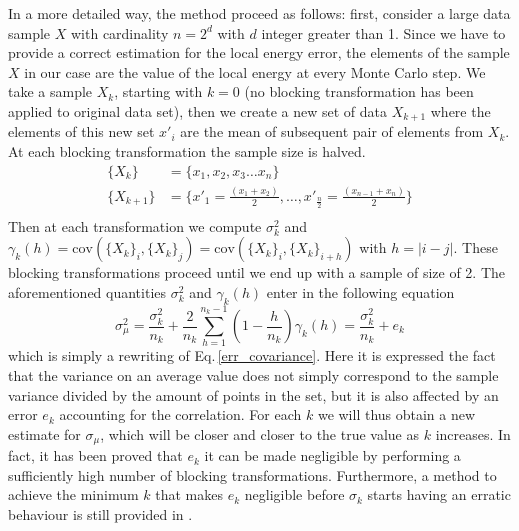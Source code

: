 In a more detailed way, the method proceed as follows: first, consider a large data sample $X$ with cardinality $n=2^d$ with $d$ integer greater than 1. Since we have to provide a correct estimation for the local energy error, the elements of the sample $X$ in our case are the value of the local energy at every Monte Carlo step. We take a sample $X_k$, starting with $k=0$ (no blocking transformation has been applied to original data set), then we create a new set of data $X_{k+1}$ where the elements of this new set $x'_i$ are the mean of subsequent pair of elements from $X_k$. At each blocking transformation the sample size is halved.
\begin{align*}
    \{X_k\} &= \{x_1, x_2, x_3 \dots x_n\} \\
    \{X_{k+1}\} &= \bigg\{x'_1=\frac{(x_1+x_2)}{2}, \dots , x'_{\frac{n}{2}}=\frac{(x_{n-1} + x_{n})}{2} \bigg\} \\
\end{align*}
Then at each transformation we compute $\sigma_k^2$ and $\gamma_k(h) = \text{cov}(\{X_k\}_i , \{X_k\}_j)=\text{cov}(\{X_k\}_i , \{X_k\}_{i+h})$ with $h =|i-j|$. These blocking transformations proceed until we end up with a sample of size of 2. The aforementioned quantities $\sigma_k^2$ and $\gamma_k(h)$ enter in the following equation
\begin{equation*}
    \sigma_{\mu}^2 = \frac{\sigma_k^2}{n_k} + \frac{2}{n_k}\sum_{h=1}^{n_k - 1} \left(1-\frac{h}{n_k}\right)\gamma_k(h) = \frac{\sigma_k^2}{n_k} +e_k
\end{equation*}
which is simply a rewriting of Eq.\,\ref{err_covariance}. Here it is expressed the fact that the variance on an average value does not simply correspond to the sample variance divided by the amount of points in the set, but it is also affected by an error $e_k$ accounting for the correlation. For each $k$ we will thus obtain a new estimate for $\sigma_{\mu}$, which will be closer and closer to the true value as $k$ increases. In fact, it has been proved \cite{Marius} that $e_k$ it can be made negligible by performing a sufficiently high number of blocking transformations. Furthermore, a method to achieve the minimum $k$ that makes $e_k$ negligible before $\sigma_k$ starts having an erratic behaviour is still provided in \cite{Marius}. 


